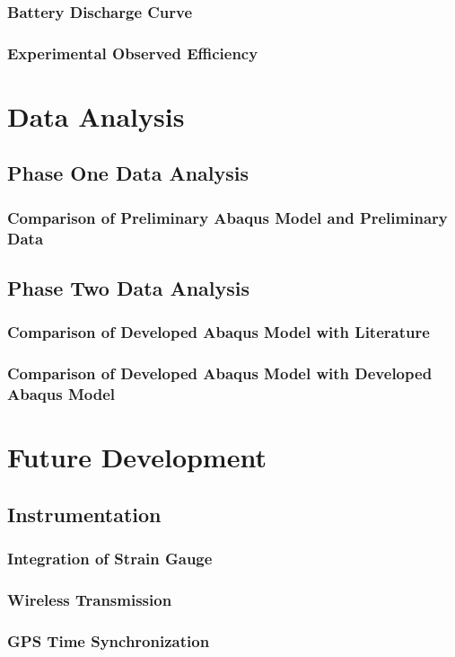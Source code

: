 \documentclass[twoside,11pt]{report}
\begin{document}
		\subsection{Battery Discharge Curve}
		\subsection{Experimental Observed Efficiency}
\chapter{Data Analysis}
	\section{Phase One Data Analysis}
		\subsection{Comparison of Preliminary Abaqus Model and Preliminary Data}
	\section{Phase Two Data Analysis}
		\subsection{Comparison of Developed Abaqus Model with Literature}
		\subsection{Comparison of Developed Abaqus Model with Developed Abaqus Model}	
		
\chapter{Future Development}
	\section{Instrumentation}
		\subsection{Integration of Strain Gauge}
		\subsection{Wireless Transmission}
		\subsection{GPS Time Synchronization}
\end{document}
